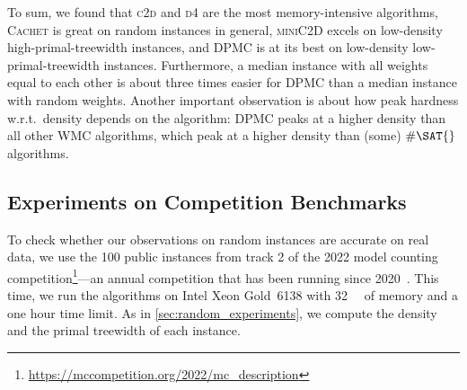 \documentclass[runningheads]{llncs}
\begin{document}
To sum, we found that \textsc{c2d} and \textsc{d4} are the most memory-intensive
algorithms, \textsc{Cachet} is great on random instances in general,
\textsc{miniC2D} excels on low-density high-primal-treewidth instances, and
\textsc{DPMC} is at its best on low-density low-primal-treewidth instances.
Furthermore, a median instance with all weights equal to each other is about
three times easier for \textsc{DPMC} than a median instance with random weights.
Another important observation is about how peak hardness w.r.t.\ density depends
on the algorithm: \textsc{DPMC} peaks at a higher density than all other
\textsf{WMC} algorithms, which peak at a higher density than (some) $\#\SAT{}$
algorithms.

\subsection{Experiments on Competition
  Benchmarks}\label{sec:benchmark_experiments}

To check whether our observations on random instances are accurate on real data,
we use the 100 public instances from track 2 of the 2022 model counting
competition\footnote{\url{https://mccompetition.org/2022/mc\_description}}---an
annual competition that has been running since
2020~\cite{DBLP:journals/jea/FichteHH21}. This time, we run the algorithms on
Intel Xeon Gold~6138 with \SI{32}{\gibi\byte} of memory and a one hour time
limit. As in \cref{sec:random_experiments}, we compute the density and the
primal treewidth of each instance.
\end{document}
